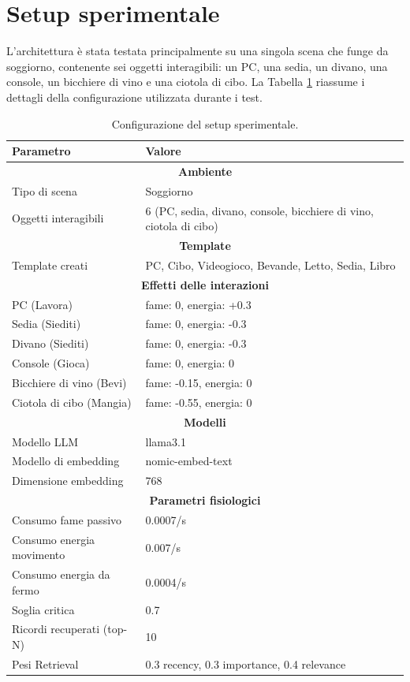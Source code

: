 \section{Setup sperimentale}

L'architettura è stata testata principalmente su una singola scena che funge da soggiorno, contenente sei oggetti interagibili: un PC, una sedia, un divano, una console, un bicchiere di vino e una ciotola di cibo. La Tabella \ref{tab:setup} riassume i dettagli della configurazione utilizzata durante i test.

\begin{table}[H]
	\centering
	\caption{Configurazione del setup sperimentale.}
	\label{tab:setup}
	\begin{tabularx}{\textwidth}{|l|X|}
		\hline
		\textbf{Parametro} & \textbf{Valore} \\
		\hline
		\multicolumn{2}{|c|}{\textbf{Ambiente}} \\
		\hline
		Tipo di scena & Soggiorno \\
		Oggetti interagibili & 6 (PC, sedia, divano, console, bicchiere di vino, ciotola di cibo) \\
		\hline
		\multicolumn{2}{|c|}{\textbf{Template}} \\
		\hline
		Template creati & PC, Cibo, Videogioco, Bevande, Letto, Sedia, Libro \\
		\hline
		\multicolumn{2}{|c|}{\textbf{Effetti delle interazioni}} \\
		\hline
		PC (Lavora) & fame: 0, energia: +0.3 \\
		Sedia (Siediti) & fame: 0, energia: -0.3 \\
		Divano (Siediti) & fame: 0, energia: -0.3 \\
		Console (Gioca) & fame: 0, energia: 0 \\
		Bicchiere di vino (Bevi) & fame: -0.15, energia: 0 \\
		Ciotola di cibo (Mangia) & fame: -0.55, energia: 0 \\
		\hline
		\multicolumn{2}{|c|}{\textbf{Modelli}} \\
		\hline
		Modello LLM & llama3.1 \\
		Modello di embedding & nomic-embed-text \\
		Dimensione embedding & 768 \\
		\hline
		\multicolumn{2}{|c|}{\textbf{Parametri fisiologici}} \\
		\hline
		Consumo fame passivo & 0.0007/s \\
		Consumo energia movimento & 0.007/s \\
		Consumo energia da fermo & 0.0004/s \\
		Soglia critica & 0.7 \\
		Ricordi recuperati (top-N) & 10 \\
		Pesi Retrieval & 0.3 recency, 0.3 importance, 0.4 relevance \\
		\hline
	\end{tabularx}
\end{table}

